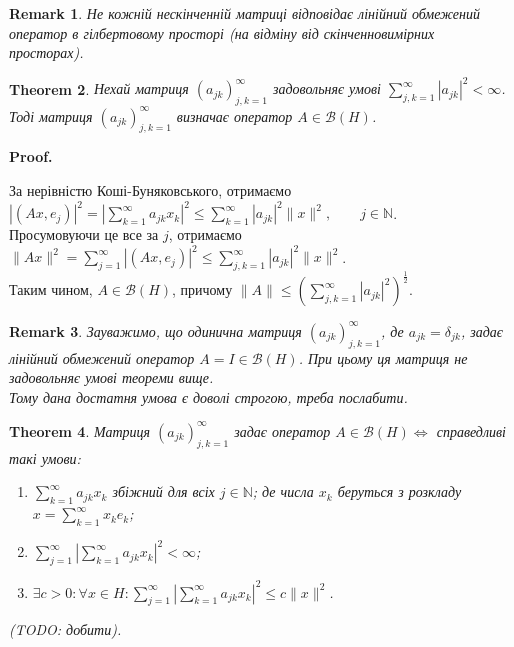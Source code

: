 \documentclass[a4paper, 10pt]{article}
\makeatletter
\theoremstyle{theoremdd}
\newtheorem{theorem}{Theorem}[subsection]
\theoremstyle{theoremdd}
\theoremstyle{theoremdd}
\theoremstyle{theoremdd}
\theoremstyle{theoremdd}
\theoremstyle{theoremdd}
\newtheorem{remark}[theorem]{Remark}
\theoremstyle{theoremdd}
\theoremstyle{theoremdd}
\renewenvironment{proof}[1][Proof.\\]{\par
\pushQED{\hfill \qed}%
\normalfont \topsep6\p@\@plus6\p@\relax
\trivlist
\item\relax
{\bfseries
#1\@addpunct{.}}\hspace\labelsep\ignorespaces
}{%
\popQED\endtrivlist\@endpefalse
}
\makeatother
\begin{document}
\begin{remark}
Не кожній нескінченній матриці відповідає лінійний обмежений оператор в гілбертовому просторі (на відміну від скінченновимірних просторах).
\end{remark}

\begin{theorem}
Нехай матриця $(a_{jk})_{j,k=1}^\infty$ задовольняє умові $\displaystyle\sum_{j,k=1}^\infty |a_{jk}|^2 < \infty$. Тоді матриця $(a_{jk})_{j,k=1}^\infty$ визначає оператор $A \in \mathcal{B}(H)$.
\end{theorem}

\begin{proof}
За нерівністю Коші-Буняковського, отримаємо\\
$|(Ax,e_j)|^2 = \displaystyle\left| \sum_{k=1}^\infty a_{jk} x_k \right|^2 \leq \sum_{k=1}^\infty |a_{jk}|^2 \|x\|^2, \qquad j \in \mathbb{N}$.\\
Просумовуючи це все за $j$, отримаємо\\
$\|Ax\|^2 = \displaystyle\sum_{j=1}^\infty |(Ax,e_j)|^2 \leq \sum_{j,k=1}^\infty |a_{jk}|^2 \|x\|^2$.\\
Таким чином, $A \in \mathcal{B}(H)$, причому $\|A\| \leq \displaystyle \left( \sum_{j,k=1}^\infty |a_{jk}|^2 \right)^{\frac{1}{2}}$.
\end{proof}

\begin{remark}
Зауважимо, що одинична матриця $(a_{jk})_{j,k=1}^\infty$, де $a_{jk} = \delta_{jk}$, задає лінійний обмежений оператор $A = I \in \mathcal{B}(H)$. При цьому ця матриця не задовольняє умові теореми вище.\\
Тому дана достатня умова є доволі строгою, треба послабити.
\end{remark}

\begin{theorem}
Матриця $(a_{jk})_{j,k=1}^\infty$ задає оператор $A \in \mathcal{B}(H) \iff$ справедливі такі умови:
\begin{enumerate}[nosep,wide=0pt,label={\arabic*)}]
\item $\displaystyle\sum_{k=1}^\infty a_{jk} x_k$ збіжний для всіх $j \in \mathbb{N}$; де числа $x_k$ беруться з розкладу $x = \displaystyle\sum_{k=1}^\infty x_k e_k$;
\item $\displaystyle\sum_{j=1}^\infty \left| \sum_{k=1}^\infty a_{jk} x_k \right|^2 < \infty$;
\item $\exists c > 0: \forall x \in H: \displaystyle\sum_{j=1}^\infty \left| \sum_{k=1}^\infty a_{jk} x_k \right|^2  \leq c \|x\|^2$.
\end{enumerate}
\textit{(TODO: добити)}.
\end{theorem}
\end{document}
